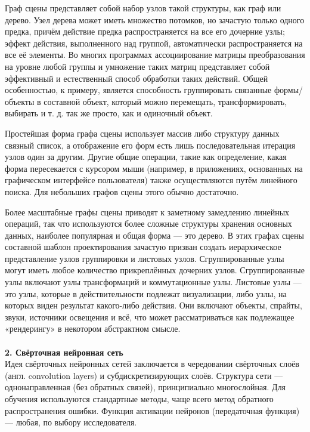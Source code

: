 \documentclass{article}
\begin{document}
    Граф сцены представляет собой набор узлов такой структуры, как граф или дерево. Узел дерева может иметь множество потомков, но зачастую только одного предка, причём действие предка распространяется на все его дочерние узлы; эффект действия, выполненного над группой, автоматически распространяется на все её элементы. Во многих программах ассоциирование матрицы преобразования на уровне любой группы и умножение таких матриц представляет собой эффективный и естественный способ обработки таких действий. Общей особенностью, к примеру, является способность группировать связанные формы/объекты в составной объект, который можно перемещать, трансформировать, выбирать и т. д. так же просто, как и одиночный объект. 
    
Простейшая форма графа сцены использует массив либо структуру данных связный список, а отображение его форм есть лишь последовательная итерация узлов один за другим. Другие общие операции, такие как определение, какая форма пересекается с курсором мыши (например, в приложениях, основанных на графическом интерфейсе пользователя) также осуществляются путём линейного поиска. Для небольших графов сцены этого обычно достаточно.

Более масштабные графы сцены приводят к заметному замедлению линейных операций, так что используются более сложные структуры хранения основных данных, наиболее популярная и общая форма — это дерево. В этих графах сцены составной шаблон проектирования зачастую призван создать иерархическое представление узлов группировки и листовых узлов. Сгруппированные узлы могут иметь любое количество прикреплённых дочерних узлов. Сгруппированные узлы включают узлы трансформаций и коммутационные узлы. Листовые узлы — это узлы, которые в действительности подлежат визуализации, либо узлы, на которых виден результат какого-либо действия. Они включают объекты, спрайты, звуки, источники освещения и всё, что может рассматриваться как подлежащее «рендерингу» в некотором абстрактном смысле. \\ \\
    \textbf{2. Свёрточная нейронная сеть}\\
    Идея свёрточных нейронных сетей заключается в чередовании свёрточных слоёв (англ. convolution layers) и субдискретизирующих слоёв. Структура сети — однонаправленная (без обратных связей), принципиально многослойная. Для обучения используются стандартные методы, чаще всего метод обратного распространения ошибки. Функция активации нейронов (передаточная функция) — любая, по выбору исследователя. \\
    
\end{document}
